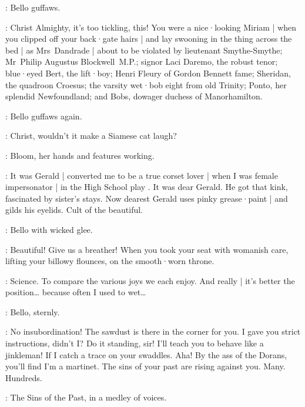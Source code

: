 :
Bello guffaws.

\Bello:
Christ Almighty,
it's too tickling,
this!
You were a nice·looking Miriam |
when you clipped off your back·gate hairs |
%
and lay swooning in the thing across the bed |
as Mrs~Dandrade |
about to be violated by lieutenant Smythe-Smythe;
Mr~Philip Augustus Blockwell~M.P.;
signor Laci Daremo,
the robust tenor;
blue·eyed Bert,
the lift·boy;
Henri Fleury of Gordon Bennett fame;
Sheridan,
the quadroon Croesus;
the varsity wet·bob eight from old Trinity;
Ponto,
her splendid Newfoundland;
and Bobs,
dowager duchess of Manorhamilton.

:
Bello guffaws again.

\Bello:
Christ,
wouldn't it make a Siamese cat laugh?

:
Bloom,
her hands and features working.

\Bloom:
It was Gerald |
converted me to be a true corset lover |
%
when I was female impersonator |
in the High School play .
It was dear Gerald.
He got that kink,
fascinated by sister's stays.
Now dearest Gerald uses pinky grease·paint |
and gilds his eyelids.
Cult of the beautiful.

:
Bello with wicked glee.

\Bello:
Beautiful!
Give us a breather!
When you took your seat with womanish care,
lifting your billowy flounces,
on the smooth·worn throne.

\Bloom:
Science.
To compare the various joys we each enjoy.
And really |
it's better the position…
%
because often I used to wet…

:
Bello,
sternly.

\Bello:
No insubordination!
The sawdust is there in the corner for you.
I gave you strict instructions,
didn't I?
Do it standing,
sir!
I'll teach you to behave like a jinkleman!
If I catch a trace on your swaddles.
Aha!
By the ass of the Dorans,
you'll find I'm a martinet.
The sins of your past are rising against you.
Many.
Hundreds.


:
The Sins of the Past,
in a medley of voices.

